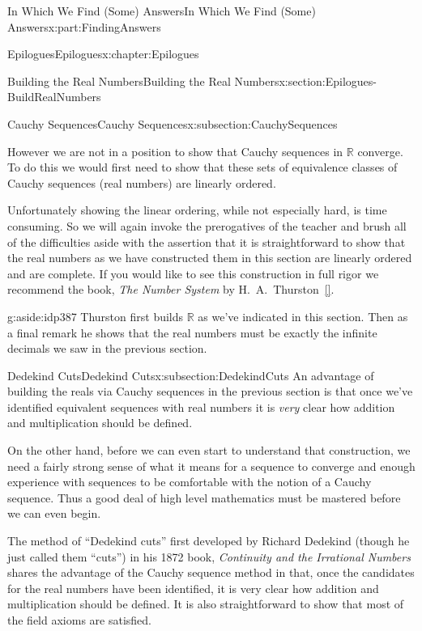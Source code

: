 \documentclass[oneside,10pt,]{book}
\newcommand{\xreffont}{\relax}
\numberwithin{equation}{section}
\newcommand{\RR}{\mathbb {R}}
\begin{document}
\begin{partptx}{In Which We Find (Some) Answers}{}{In Which We Find (Some) Answers}{}{}{x:part:FindingAnswers}
\begin{chapterptx}{Epilogues}{}{Epilogues}{}{}{x:chapter:Epilogues}
\begin{sectionptx}{Building the Real Numbers}{}{Building the Real Numbers}{}{}{x:section:Epilogues-BuildRealNumbers}
\begin{subsectionptx}{Cauchy Sequences}{}{Cauchy Sequences}{}{}{x:subsection:CauchySequences}
\par
However we are not in a position to show that Cauchy sequences in \(\RR\) converge.  To do this we would first need to show that these sets of equivalence classes of Cauchy sequences (real numbers) are linearly ordered.%
\par
Unfortunately showing the linear ordering, while not especially hard, is time consuming. So we will again invoke the prerogatives of the teacher and brush all of the difficulties aside with the assertion that it is straightforward to show that the real numbers as we have constructed them in this section are linearly ordered and are complete. If you would like to see this construction in full rigor we recommend the book, \emph{The Number System} by H.~A.~Thurston~\hyperlink{x:biblio:thurston56__number_system}{[{\xreffont 16}]}.%
\begin{aside}{}{g:aside:idp387}%
Thurston first builds \(\RR\) as we've indicated in this section. Then as a final remark he shows that the real numbers must be exactly the infinite decimals we saw in the previous section.%
\end{aside}
\end{subsectionptx}
%
%
\typeout{************************************************}
\typeout{************************************************}
%
\begin{subsectionptx}{Dedekind Cuts}{}{Dedekind Cuts}{}{}{x:subsection:DedekindCuts}
An advantage of building the reals via Cauchy sequences in the previous section is that once we've identified equivalent sequences with real numbers it is \emph{very} clear how addition and multiplication should be defined.%
\par
On the other hand, before we can even start to understand that construction, we need a fairly strong sense of what it means for a sequence to converge and enough experience with sequences to be comfortable with the notion of a Cauchy sequence. Thus a good deal of high level mathematics must be mastered before we can even begin.%
\par
The method of ``Dedekind cuts'' first developed by Richard Dedekind  (though he just called them ``cuts'') in his 1872 book, \emph{Continuity and the Irrational Numbers} shares the advantage of the Cauchy sequence method in that, once the candidates for the real numbers have been identified, it is very clear how addition and multiplication should be defined. It is also straightforward to show that most of the field axioms are satisfied.%

\end{subsectionptx}
\end{sectionptx}
\end{chapterptx}
\end{partptx}
\end{document}
